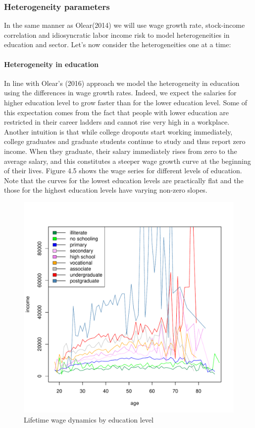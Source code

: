 \documentclass[]{elsarticle}
\begin{document}
\subsubsection{Heterogeneity parameters}
In the same manner as Olear(2014) we will use wage growth rate, stock-income correlation and idiosyncratic labor income risk to model heterogeneities in education and sector. Let's now consider the heterogeneities one at a time:

\paragraph{Heterogeneity in education}
In line with Olear's (2016) approach we model the heterogeneity in education using the differences in wage growth rates. Indeed, we expect the salaries for higher education level to grow faster than for the lower education level. Some of this expectation comes from the fact that people with lower education are restricted in their career ladders and cannot rise very high in a workplace. Another intuition is that while college dropouts start working immediately, college graduates and graduate students continue to study and thus report zero income. When they graduate, their salary immediately rises from zero to the average salary, and this constitutes a steeper wage growth curve at the beginning of their lives. Figure 4.5 shows the wage series for different levels of education. Note that the curves for the lowest education levels are practically flat and the those for the highest education levels have varying non-zero slopes. 

\begin{figure}[h]
	\centering
	\includegraphics[scale=0.6]{figs/wage2educ.pdf}
	\caption{Lifetime wage dynamics by education level}
\end{figure}
\end{document}

